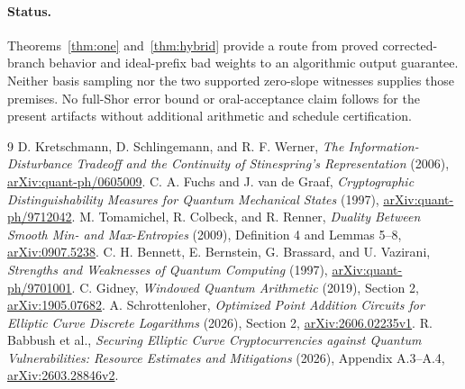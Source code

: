 \documentclass[11pt]{article}
\begin{document}
\paragraph{Status.}
Theorems~\ref{thm:one} and~\ref{thm:hybrid} provide a route from proved corrected-branch behavior and ideal-prefix bad weights to an algorithmic output guarantee. Neither basis sampling nor the two supported zero-slope witnesses supplies those premises. No full-Shor error bound or oral-acceptance claim follows for the present artifacts without additional arithmetic and schedule certification.

\begin{thebibliography}{9}
 D. Kretschmann, D. Schlingemann, and R. F. Werner, \emph{The Information-Disturbance Tradeoff and the Continuity of Stinespring's Representation} (2006), \href{https://arxiv.org/abs/quant-ph/0605009}{arXiv:quant-ph/0605009}.
 C. A. Fuchs and J. van de Graaf, \emph{Cryptographic Distinguishability Measures for Quantum Mechanical States} (1997), \href{https://arxiv.org/abs/quant-ph/9712042}{arXiv:quant-ph/9712042}.
 M. Tomamichel, R. Colbeck, and R. Renner, \emph{Duality Between Smooth Min- and Max-Entropies} (2009), Definition 4 and Lemmas 5--8, \href{https://arxiv.org/abs/0907.5238}{arXiv:0907.5238}.
 C. H. Bennett, E. Bernstein, G. Brassard, and U. Vazirani, \emph{Strengths and Weaknesses of Quantum Computing} (1997), \href{https://arxiv.org/abs/quant-ph/9701001}{arXiv:quant-ph/9701001}.
 C. Gidney, \emph{Windowed Quantum Arithmetic} (2019), Section 2, \href{https://arxiv.org/abs/1905.07682}{arXiv:1905.07682}.
 A. Schrottenloher, \emph{Optimized Point Addition Circuits for Elliptic Curve Discrete Logarithms} (2026), Section 2, \href{https://arxiv.org/abs/2606.02235v1}{arXiv:2606.02235v1}.
 R. Babbush et al., \emph{Securing Elliptic Curve Cryptocurrencies against Quantum Vulnerabilities: Resource Estimates and Mitigations} (2026), Appendix A.3--A.4, \href{https://arxiv.org/abs/2603.28846v2}{arXiv:2603.28846v2}.
\end{thebibliography}
\end{document}
